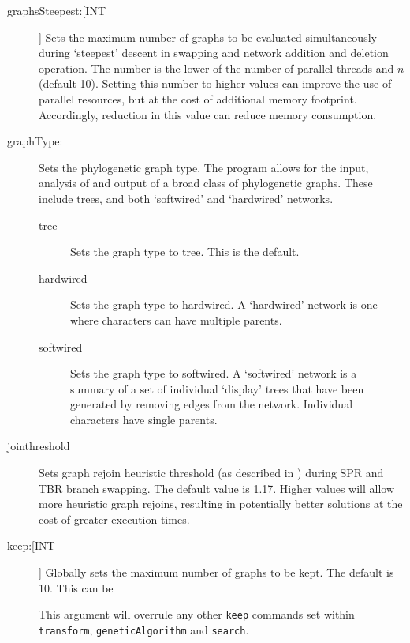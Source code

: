 \begin{description}
		\item[graphsSteepest:[INT]] Sets the maximum number of graphs to be evaluated 
		simultaneously during `steepest' descent in swapping and network addition and 
		deletion operation. The number is the lower of the number of parallel threads 
		and $n$ (default 10). Setting this number to higher values can improve the use of 
		parallel resources, but at the cost of additional memory footprint. Accordingly, 
		reduction in this value can reduce memory consumption.
			
		\item[graphType:] Sets the phylogenetic graph type. The program allows for the input, 
		analysis of and output of a broad class of phylogenetic graphs. These include trees, 
		and both `softwired’ and `hardwired’ networks. 
			
		\begin{description}
			
			\item[tree] Sets the graph type to tree. This is the default.
		
			\item[hardwired]  Sets the graph type to hardwired. A `hardwired' network is 
			one where characters can have multiple parents.
	
			\item[softwired]  Sets the graph type to softwired. A `softwired' network is 
			a summary of a set of individual `display' trees that have been generated by 
			removing edges from the network. Individual characters have single parents.	
						
		\end{description}
			
		\item[jointhreshold] Sets graph rejoin heuristic threshold (as described in 
		\citealp{VaronandWheeler2013}) during SPR and TBR branch swapping. The 
		default value is 1.17. Higher values will allow more heuristic graph rejoins, 
		resulting in potentially better solutions at the cost of greater execution times.


		\item[keep:[INT]] Globally sets the maximum number of graphs to be kept.
		The default is 10. This can be 
		
		This argument will overrule any other \texttt{keep} commands
		set within \texttt{transform}, \texttt{geneticAlgorithm} and \texttt{search}.


\end{description}

